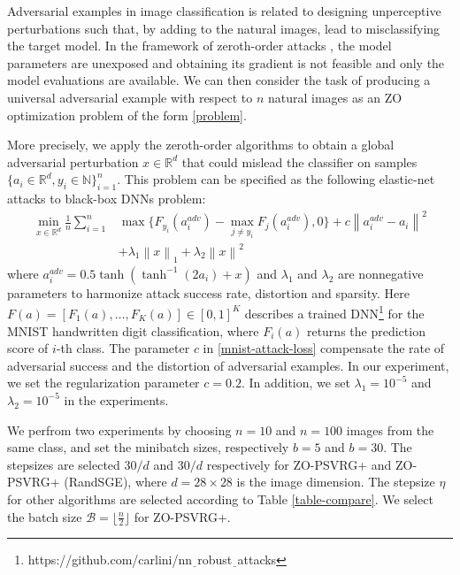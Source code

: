 \documentclass{article}
\newcommand*{\R}{\mathbb{R}}
\newcommand{\norm}[1]{\left\lVert#1\right\rVert}
\theoremstyle{definition}
\theoremstyle{remark}
\begin{document}
{\color{Brown}
Adversarial 
examples in image classification is related to designing unperceptive perturbations such that, by adding to the natural images, lead to misclassifying the target model. In the framework of zeroth-order attacks \cite{chen2017zoo,liu2018zeroth}, the model parameters are unexposed and obtaining its gradient is not feasible and only
the model evaluations are available. We can then consider the task of producing a universal adversarial
example with respect to $n$ natural images as an ZO optimization problem of the form \eqref{problem}.
{\color{Green}
More precisely, we apply the zeroth-order algorithms to obtain a global adversarial perturbation $x\in\R^d$ that could mislead the classifier on samples $\{a_i \in \R^d, y_i\in\mathbb{N} \}_{i=1}^n$. This problem can be specified as the following elastic-net attacks to black-box DNNs problem:
\begin{equation}\label{mnist-attack-loss}
\begin{split}
\min_{x\in\R^d} \frac{1}{n} \sum_{i=1}^n& \max\{F_{y_i}(a_i^{adv}) - \max_{j\neq y_i}F_j(a_i^{adv}),0\} + c\norm{a_i^{adv} - a_i}^2 \\
&+ \lambda_1 \norm{x}_{1} + \lambda_2 \norm{x}^{2}
\end{split}
\end{equation}
where $a_i^{adv} = 0.5\tanh(\tanh^{-1}(2a_i)+x)$ and $\lambda_1$ and $\lambda_2$ are nonnegative parameters to harmonize attack success rate, distortion and sparsity. Here $F(a) = \left[F_1(a),\ldots,F_K(a)\right]\in [0, 1]^K$ describes a trained DNN{\footnote{https://github.com/carlini/nn$\underline{~~}$robust$\underline{~~}$attacks}} for the MNIST handwritten digit classification, where $F_i(a)$ returns the prediction score of $i$-th class. {\color{Brown} The parameter $c$ in \eqref{mnist-attack-loss} compensate the rate of adversarial success and the distortion of adversarial examples. In our experiment, we set the regularization parameter  $c = 0.2$. In addition, we set {\color{red} $\lambda_1 = 10^{-5}$} and {\color{red} $\lambda_2 = 10^{-5}$} in the experiments.  }

}
We perfrom two experiments by choosing $n = 10$ and $n=100$ images from the same class, and set the minibatch sizes, respectively $b=5$ and $b = 30$. The stepsizes are selected {\color{red} $30/d$} and {\color{red} $30/d$} respectively for ZO-PSVRG+  and ZO-PSVRG+ (RandSGE), where $d = 28 \times 28$ is the image dimension. The stepsize $\eta$ for other algorithms are selected according to Table \ref{table-compare}. We select the batch size $\mathcal{B} = \lfloor{\frac{n}{2}}\rfloor$ for ZO-PSVRG+.
{\color{Green}

}
}
\end{document}
